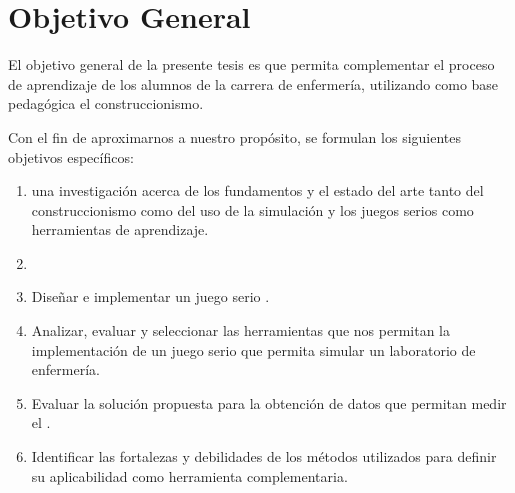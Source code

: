 \section{Objetivo General}

El objetivo general de la presente tesis es  que permita complementar el
proceso de aprendizaje de los alumnos de la carrera de enfermería, utilizando
como base pedagógica el construccionismo.

Con el fin de aproximarnos a nuestro propósito, se formulan los siguientes
objetivos específicos:

\begin{enumerate}
    \item {} una investigación acerca de los
        fundamentos y el estado del arte tanto del construccionismo como del uso
        de la simulación y los juegos serios como herramientas de aprendizaje.

    \item {}

    \item Diseñar e implementar un juego serio .

    \item Analizar, evaluar y seleccionar las herramientas que nos permitan la
        implementación de un juego serio que permita simular un laboratorio de
        enfermería.

    \item Evaluar la solución propuesta para la obtención de datos que permitan
        medir el .

    \item Identificar las fortalezas y debilidades de los métodos utilizados
        para definir su aplicabilidad como herramienta complementaria. 

\end{enumerate}


